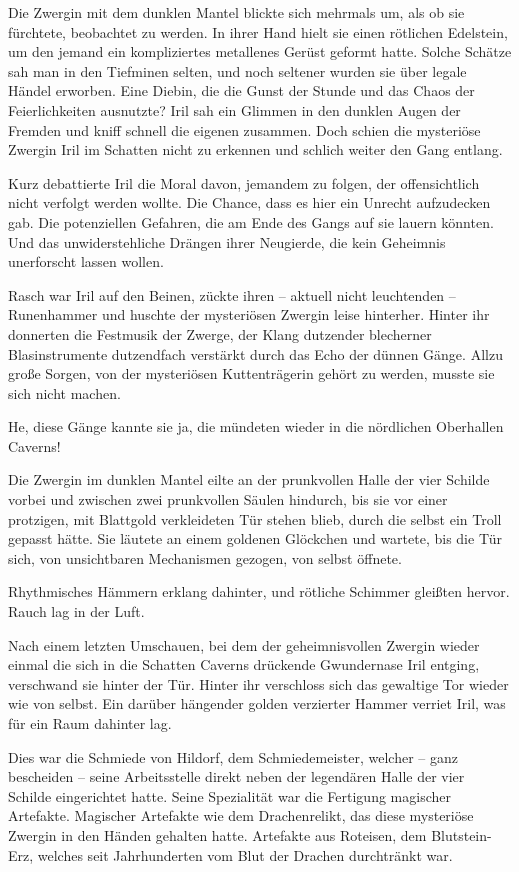 Die Zwergin mit dem dunklen Mantel blickte sich mehrmals um, als ob sie fürchtete, beobachtet zu werden. In ihrer Hand hielt sie einen rötlichen Edelstein, um den jemand ein kompliziertes metallenes Gerüst geformt hatte. Solche Schätze sah man in den Tiefminen selten, und noch seltener wurden sie über legale Händel erworben. Eine Diebin, die die Gunst der Stunde und das Chaos der Feierlichkeiten ausnutzte? Iril sah ein Glimmen in den dunklen Augen der Fremden und kniff schnell die eigenen zusammen. Doch schien die mysteriöse Zwergin Iril im Schatten nicht zu erkennen und schlich weiter den Gang entlang.

Kurz debattierte Iril die Moral davon, jemandem zu folgen, der offensichtlich nicht verfolgt werden wollte. Die Chance, dass es hier ein Unrecht aufzudecken gab. Die potenziellen Gefahren, die am Ende des Gangs auf sie lauern könnten. Und das unwiderstehliche Drängen ihrer Neugierde, die kein Geheimnis unerforscht lassen wollen.

Rasch war Iril auf den Beinen, zückte ihren – aktuell nicht leuchtenden – Runenhammer und huschte der mysteriösen Zwergin leise hinterher. Hinter ihr donnerten die Festmusik der Zwerge, der Klang dutzender blecherner Blasinstrumente dutzendfach verstärkt durch das Echo der dünnen Gänge. Allzu große Sorgen, von der mysteriösen Kuttenträgerin gehört zu werden, musste sie sich nicht machen.

He, diese Gänge kannte sie ja, die mündeten wieder in die nördlichen Oberhallen Caverns!

Die Zwergin im dunklen Mantel eilte an der prunkvollen Halle der vier Schilde vorbei und zwischen zwei prunkvollen Säulen hindurch, bis sie vor einer protzigen, mit Blattgold verkleideten Tür stehen blieb, durch die selbst ein Troll gepasst hätte. Sie läutete an einem goldenen Glöckchen und wartete, bis die Tür sich, von unsichtbaren Mechanismen gezogen, von selbst öffnete.

Rhythmisches Hämmern erklang dahinter, und rötliche Schimmer gleißten hervor. Rauch lag in der Luft.

Nach einem letzten Umschauen, bei dem der geheimnisvollen Zwergin wieder einmal die sich in die Schatten Caverns drückende Gwundernase Iril entging, verschwand sie hinter der Tür. Hinter ihr verschloss sich das gewaltige Tor wieder wie von selbst. Ein darüber hängender golden verzierter Hammer verriet Iril, was für ein Raum dahinter lag.

Dies war die Schmiede von Hildorf, dem Schmiedemeister, welcher – ganz bescheiden – seine Arbeitsstelle direkt neben der legendären Halle der vier Schilde eingerichtet hatte. Seine Spezialität war die Fertigung magischer Artefakte. Magischer Artefakte wie dem Drachenrelikt, das diese mysteriöse Zwergin in den Händen gehalten hatte. Artefakte aus Roteisen, dem Blutstein-Erz, welches seit Jahrhunderten vom Blut der Drachen durchtränkt war.

